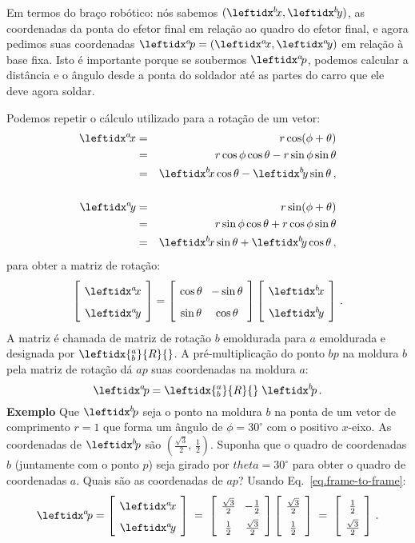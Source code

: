 Em termos do braço robótico: nós sabemos $(\bx,\by)$, as coordenadas da ponta do efetor final em relação ao quadro do efetor final, e agora pedimos suas coordenadas $\ap=(\ax,\ay)$ em relação à base fixa. Isto é importante porque se soubermos $\ap$, podemos calcular a distância e o ângulo desde a ponta do soldador até as partes do carro que ele deve agora soldar.

Podemos repetir o cálculo utilizado para a rotação de um vetor:
\begin{eqnarray*}
\ax &=& r\cos(\phi+\theta)\\
&=&r\cos\phi\cos\theta - r\sin\phi\sin\theta\\
&=&\bx\cos\theta - \by\sin\theta\,,\\
\\
\ay &=& r\sin(\phi+\theta)\\
&=&r\sin\phi\cos\theta + r\cos\phi\sin\theta\\
&=&\bx\sin\theta + \by\cos\theta\,,\\
\end{eqnarray*}
para obter a matriz de rotação:
\begin{equation}
\spacearray
\left[\begin{array}{c}\ax\\\ay\end{array}\right]=
\left[\begin{array}{cc}\cos\theta&-\sin\theta\\\sin\theta&\cos\theta\end{array}\right]
\left[\begin{array}{c}\bx\\\by\end{array}\right]\,.\label{eq.frame-to-frame}
\end{equation}
A matriz é chamada de matriz de rotação $b$ emoldurada para $a$ emoldurada e designada por $\leftidx{^a_b}{R}{}$. A pré-multiplicação do ponto $bp$ na moldura $b$ pela matriz de rotação dá $ap$ suas coordenadas na moldura $a$:
\[
\ap = \leftidx{^a_b}{R}{} \; \bp\,.
\]
\noindent\textbf{Exemplo} Que $\bp$ seja o ponto na moldura $b$ na ponta de um vetor de comprimento $r=1$ que forma um ângulo de $\phi=30^{\circ}$ com o positivo $x$-eixo. As coordenadas de $\bp$ são $\left(\frac{\sqrt{3}}{2},\,\frac{1}{2}\right)$. Suponha que o quadro de coordenadas $b$ (juntamente com o ponto $p$) seja girado por $theta=30^{\circ}$ para obter o quadro de coordenadas $a$. Quais são as coordenadas de $ap$? Usando Eq.~\ref{eq.frame-to-frame}:
\[
\spacearray
\ap=
\left[\begin{array}{c}\ax\\\ay\end{array}\right]\;=\;
\left[\begin{array}{cc}\frac{\sqrt{3}}{2}&-\frac{1}{2}\\\frac{1}{2}&\frac{\sqrt{3}}{2}\end{array}\right]
\left[\begin{array}{c}\frac{\sqrt{3}}{2}\\\frac{1}{2}\end{array}\right]\;=\;
\left[\begin{array}{c}\frac{1}{2}\\\frac{\sqrt{3}}{2}\end{array}\right]\,.
\]
